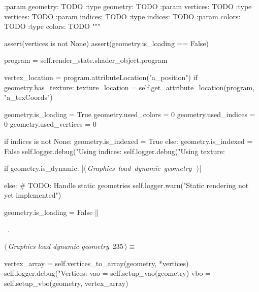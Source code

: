 \documentclass[%
    a4paper,    %
    justified,  %
    nobib,      %
    openany     %
]{tufte-book}
\makeatletter
\renewcommand{\label}[1]{\@tufte@label{##1}}%
\makeatother
\begin{document}
\begin{fullwidth}
\begin{flushleft}
\begin{minipage}{\linewidth}
\begin{pythoncode}
    :param geometry: TODO
    :type geometry: TODO
    :param vertices: TODO
    :type vertices: TODO
    :param indices: TODO
    :type indices: TODO
    :param colors: TODO
    :type colors: TODO
    """

    assert(vertices is not None)
    assert(geometry.is_loading == False)

    program = self.render_state.shader_object.program

    vertex_location  = program.attributeLocation("a_position")
    if geometry.has_texture:
        texture_location = self.get_attribute_location(program,
                                                       "a_texCoords")

    geometry.is_loading    = True
    geometry.used_colors  = 0
    geometry.used_indices  = 0
    geometry.used_vertices = 0

    if indices is not None:
        geometry.is_indexed = True
    else:
        geometry.is_indexed = False
    self.logger.debug("Using indices: %
    self.logger.debug("Using texture: %

    if geometry.is_dynamic:
        |\hbox{$\langle\,${\itshape Graphics load dynamic geometry}\nobreak\ {\footnotesize {}}$\,\rangle$}|

    else:
        # TODO: Handle static geometries
        self.logger.warn("Static rendering not yet implemented")

    geometry.is_loading = False
|\NWsep|
\end{pythoncode}
\vspace{1.5ex}
\footnotesize
\begin{list}{}{\setlength{\itemsep}{-\parsep}\setlength{\itemindent}{-\leftmargin}}
\item \NWtxtMacroRefIn\ .

\item{}
\end{list}
\end{minipage}\vspace{4ex}
\end{flushleft}
\begin{flushleft} \small
\begin{minipage}{\linewidth}\label{scrap251}\raggedright\small
{} $\langle\,${\itshape Graphics load dynamic geometry}\nobreak\ {\footnotesize {235}}$\,\rangle\equiv$
\vspace{-1ex}
\begin{pythoncode}
vertex_array = self.vertices_to_array(geometry, *vertices)
self.logger.debug("Vertices: %
vao = self.setup_vao(geometry)
vbo = self.setup_vbo(geometry, vertex_array)


\end{pythoncode}
\end{minipage}
\end{flushleft}
\end{fullwidth}
\end{document}
